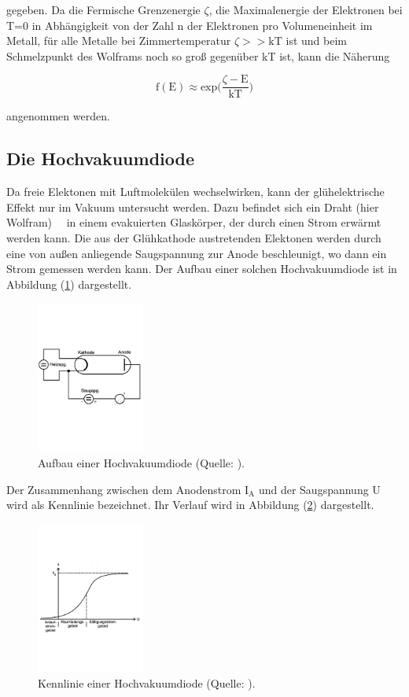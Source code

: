 \noindent
gegeben.
Da die Fermische Grenzenergie $\zeta$, 
die Maximalenergie der Elektronen bei T=0 in Abhängigkeit von der Zahl n der Elektronen pro Volumeneinheit im Metall, 
für alle Metalle bei Zimmertemperatur $\zeta >> \text{kT}$ ist 
und beim Schmelzpunkt des Wolframs noch so groß gegenüber kT ist, 
kann die Näherung

\begin{equation}
\text{f}(\text{E}) \approx \text{exp} \biggl( \frac{\zeta-\text{E}}{\text{kT}} \biggr)
\label{eqn:fermi2}
\end{equation}

\noindent
angenommen werden.
%
\subsection{Die Hochvakuumdiode}

\noindent
Da freie Elektonen mit Luftmolekülen wechselwirken, kann der glühelektrische Effekt nur im Vakuum untersucht werden.
Dazu befindet sich ein Draht (hier Wolfram)    in einem evakuierten Glaskörper, der durch einen Strom erwärmt werden kann.
Die aus der Glühkathode austretenden Elektonen werden durch eine von außen anliegende Saugspannung zur Anode beschleunigt, 
wo dann ein Strom gemessen werden kann. 
Der Aufbau einer solchen Hochvakuumdiode ist in Abbildung (\ref{fig:diode}) dargestellt.

\begin{figure}
    \centering
       \includegraphics[height=5cm]{diode.pdf}
       \caption{Aufbau einer Hochvakuumdiode (Quelle: \cite{V504}).}
       \label{fig:diode}
\end{figure}

\noindent
Der Zusammenhang zwischen dem Anodenstrom $\text{I}_\text{A}$ und der Saugspannung U wird als Kennlinie bezeichnet.
Ihr Verlauf wird in Abbildung (\ref{fig:kenn}) dargestellt.

\begin{figure}
    \centering
       \includegraphics[height=5cm]{kenn.pdf}
       \caption{Kennlinie einer Hochvakuumdiode (Quelle: \cite{V504}).}
       \label{fig:kenn}
\end{figure}


